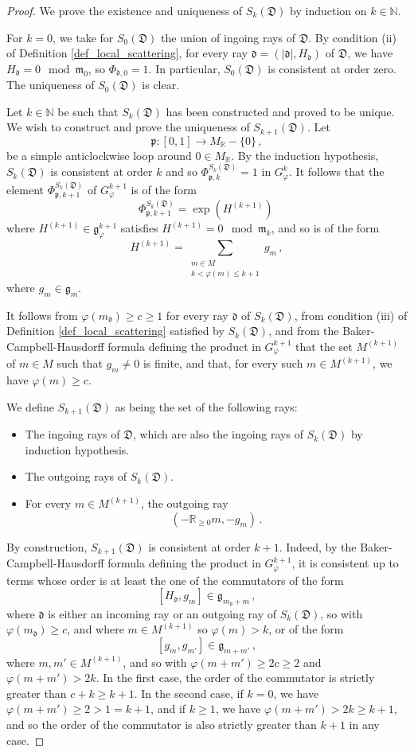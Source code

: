 \documentclass[12pt, a4paper]{amsart}
\newcommand\NN{\mathbb N}
\newcommand\R{\mathbb R}
\newcommand\fd{\mathfrak d}
\newcommand\fD{\mathfrak D}
\newcommand\fg{\mathfrak g}
\newcommand\fm{\mathfrak m}
\newcommand\fp{\mathfrak p}
\begin{document}
\begin{proof}
We prove the existence and uniqueness of 
$S_k(\fD)$ by induction on $k \in \NN$.

For $k=0$, we take for $S_0(\fD)$ the union of ingoing rays of $\fD$. By condition (ii) of Definition \ref{def_local_scattering}, for every ray $\fd=(|\fd|,H_\fd)$ of $\fD$, we have $H_\fd=0 \mod \fm_0$, so $\Phi_{\fd,0}=1$. In particular, $S_0(\fD)$ is consistent at order zero. The uniqueness of $S_0(\fD)$ is clear.


Let $k \in \NN$ be such that $S_k(\fD)$ has been constructed and proved to be unique. We wish to construct and prove the uniqueness of $S_{k+1}(\fD)$. Let 
\[\fp \colon [0,1] \rightarrow M_\R -\{0\}\,,\]
be a simple anticlockwise loop around $0 \in M_\R$. By the induction hypothesis, 
$S_k(\fD)$ is consistent at order $k$ and so $\Phi_{\fp,k}^{S_k(\fD)}=1$
in $G_\varphi^k$. 
It follows that the element $\Phi_{\fp,k+1}^{S_k(\fD)}$
of $G_\varphi^{k+1}$ is of the form
\[ \Phi_{\fp,k+1}^{S_k(\fD)}
=\exp(H^{(k+1)}) \,\]
where $H^{(k+1)} \in \fg_{\varphi}^{k+1}$ satisfies 
$H^{(k+1)}=0 \mod \fm_k$, and so is of the form
\[ H^{(k+1)}=\sum_{\substack{m \in M\\ 
k<\varphi(m) \leqslant k+1
}} g_m\,,\]
where $g_m \in \fg_m$.

It follows from $\varphi(m_\fd) \geqslant
c \geqslant 1$ for every ray $\fd$ of 
$S_k(\fD)$, from condition (iii) of Definition \ref{def_local_scattering} satisfied by $S_k(\fD)$, and from the Baker-Campbell-Hausdorff formula defining the product in $G_\varphi^{k+1}$ that the set $M^{(k+1)}$ of $m \in M$ such that 
$g_m \neq 0$ is finite, and that, for every such $m \in M^{(k+1)}$, we have $\varphi(m) \geqslant c$.

We define $S_{k+1}(\fD)$ as being the set of the following rays:
\begin{itemize}
\item[(i)] The ingoing rays of $\fD$, which are also the ingoing rays of $S_k(\fD)$ by induction hypothesis.
\item[(ii)] The outgoing rays of $S_k(\fD)$.
\item[(iii)] For every $m \in M^{(k+1)}$,
 the outgoing ray 
\[(-\R_{\geqslant 0}m, -g_m)\,.\]
\end{itemize} 

By construction, $S_{k+1}(\fD)$ is consistent at order $k+1$. Indeed, by the Baker-Campbell-Hausdorff formula defining the product in 
$G_\varphi^{k+1}$, it is 
consistent up to terms whose order is at least the one of the commutators of the form  
\[[H_\fd, g_m] \in \fg_{m_\fd+m}\,,\]
where $\fd$ is either an incoming ray or an outgoing ray of $S_k(\fD)$, so with 
$\varphi(m_\fd) \geqslant c$, and where 
$m \in M^{(k+1)}$ so $\varphi(m)>k$,
or of the form  
\[
[g_m, g_{m'}] \in \fg_{m+m'}\,,\]
where $m, m' \in M^{(k+1)}$, and so with $\varphi(m+m')\geqslant 2c\geqslant 2$ and $\varphi(m+m')>2k$. 
In the first case, the order of the commutator is strictly greater than $c+k \geqslant k+1$.
In the second case, 
if $k=0$, we have $\varphi(m+m')\geqslant 2>1=k+1$, and if $k \geqslant 1$, we have $\varphi(m+m')>2k 
\geqslant k+1$, and so the order of the commutator is also strictly greater than $k+1$ in any case.


\end{proof}
\end{document}

